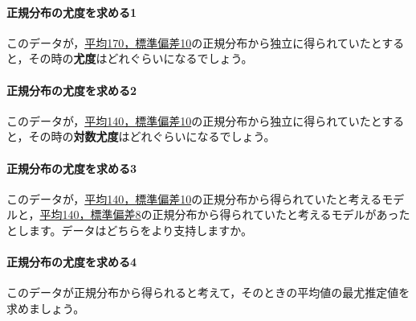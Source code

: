 \documentclass{ltjsbook}
\begin{document}
\paragraph{正規分布の尤度を求める1}このデータが，\underline{平均170，標準偏差10}の正規分布から独立に得られていたとすると，その時の\textbf{尤度}はどれぐらいになるでしょう。
\paragraph{正規分布の尤度を求める2}このデータが，\underline{平均140，標準偏差10}の正規分布から独立に得られていたとすると，その時の\textbf{対数尤度}はどれぐらいになるでしょう。
\paragraph{正規分布の尤度を求める3}このデータが，\underline{平均140，標準偏差10}の正規分布から得られていたと考えるモデルと，\underline{平均140，標準偏差8}の正規分布から得られていたと考えるモデルがあったとします。データはどちらをより支持しますか。
\paragraph{正規分布の尤度を求める4}このデータが正規分布から得られると考えて，そのときの平均値の最尤推定値を求めましょう。
\end{document}
